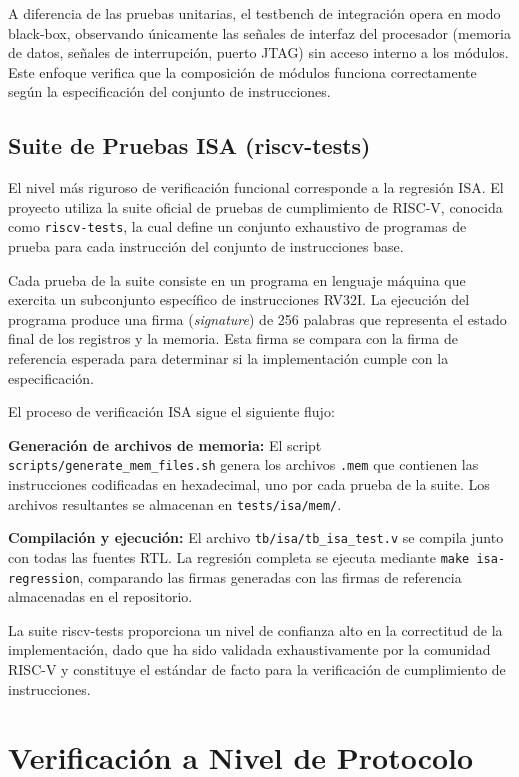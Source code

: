 A diferencia de las pruebas unitarias, el testbench de integración opera en modo black-box, observando únicamente las señales de interfaz del procesador (memoria de datos, señales de interrupción, puerto JTAG) sin acceso interno a los módulos. Este enfoque verifica que la composición de módulos funciona correctamente según la especificación del conjunto de instrucciones.

\subsection{Suite de Pruebas ISA (riscv-tests)}
\label{sec:ISATests}

El nivel más riguroso de verificación funcional corresponde a la regresión ISA. El proyecto utiliza la suite oficial de pruebas de cumplimiento de RISC-V, conocida como \texttt{riscv-tests}, la cual define un conjunto exhaustivo de programas de prueba para cada instrucción del conjunto de instrucciones base.

Cada prueba de la suite consiste en un programa en lenguaje máquina que exercita un subconjunto específico de instrucciones RV32I. La ejecución del programa produce una firma (\textit{signature}) de 256 palabras que representa el estado final de los registros y la memoria. Esta firma se compara con la firma de referencia esperada para determinar si la implementación cumple con la especificación.

El proceso de verificación ISA sigue el siguiente flujo:

\textbf{Generación de archivos de memoria:} El script \texttt{scripts/generate\_mem\_files.sh} genera los archivos \texttt{.mem} que contienen las instrucciones codificadas en hexadecimal, uno por cada prueba de la suite. Los archivos resultantes se almacenan en \texttt{tests/isa/mem/}.

\textbf{Compilación y ejecución:} El archivo \texttt{tb/isa/tb\_isa\_test.v} se compila junto con todas las fuentes RTL. La regresión completa se ejecuta mediante \texttt{make isa-regression}, comparando las firmas generadas con las firmas de referencia almacenadas en el repositorio.

La suite riscv-tests proporciona un nivel de confianza alto en la correctitud de la implementación, dado que ha sido validada exhaustivamente por la comunidad RISC-V y constituye el estándar de facto para la verificación de cumplimiento de instrucciones.

\section{Verificación a Nivel de Protocolo}
\label{sec:ProtocolVerification}


